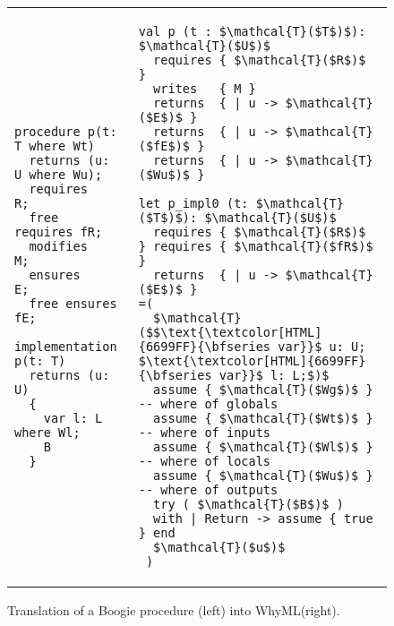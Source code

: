 \documentclass[a4paper,final]{llncs}
\newif\iflong
\newcommand{\tr}{\mathcal{T}}
\newcommand{\Boogie}{Boogie\xspace}
\newcommand{\WhyML}{WhyML\xspace}
\begin{document}
\begin{figure}[!htb]
\lstset{xleftmargin=5mm}
\scriptsize
\begin{tabular}{p{} p{}}
{\begin{lstlisting}[language=boogie]
procedure p(t: T where Wt) 
  returns (u: U where Wu);
  requires      R;
  free requires fR;
  modifies      M;
  ensures       E;
  free ensures  fE;

implementation p(t: T) 
  returns (u: U) 
  { 
    var l: L where Wl; 
    B 
  }\end{lstlisting}} 
&
\iflong
{\begin{lstlisting}[language=Why3]
val p (t : $\tr($T$)$): $\tr($U$)$
  requires { $\tr($R$)$ }
  writes   { M }
  returns  { | u -> $\tr($E$)$ }
  returns  { | u -> $\tr($fE$)$ }
  returns  { | u -> $\tr($Wu$)$ }

let p_impl0 (t: $\tr($T$)$): $\tr($U$)$
  requires { $\tr($R$)$ } requires { $\tr($fR$)$ }
  returns  { | u -> $\tr($E$)$ }
=(
  $\tr($$\text{\textcolor[HTML]{6699FF}{\bfseries var}}$ u: U; $\text{\textcolor[HTML]{6699FF}{\bfseries var}}$ l: L;$)$
  assume { $\tr($Wg$)$ }  -- where of globals
  assume { $\tr($Wt$)$ }  -- where of inputs
  assume { $\tr($Wl$)$ }  -- where of locals
  assume { $\tr($Wu$)$ }  -- where of outputs
  try ( $\tr($B$)$ )
  with | Return -> assume { true } end
  $\tr($u$)$
 )

let p_impl0_frame (t: $\tr($T$)$): $\tr($U$)$
  requires { $\tr($R$)$ } requires { $\tr($fR$)$ }
  writes { M }
  reads { $G$ } -- all globals
  returns  { | u -> true }
=( ... -- as in $\text{p\_impl0}$
   $\tr(m$ := $m)\textrm{, for }m\in$ M
   assume { yes($g$) }$\textrm{, for }g\in G$
   $\tr($u$)$ )\end{lstlisting}}
\else{\begin{lstlisting}[language=Why3]
val p (t : $\tr($T$)$): $\tr($U$)$
  requires { $\tr($R$)$ }
  writes   { M }
  returns  { | u -> $\tr($E$)$ }
  returns  { | u -> $\tr($fE$)$ }
  returns  { | u -> $\tr($Wu$)$ }

let p_impl0 (t: $\tr($T$)$): $\tr($U$)$
  requires { $\tr($R$)$ } requires { $\tr($fR$)$ }
  returns  { | u -> $\tr($E$)$ }
=(
  $\tr($$\text{\textcolor[HTML]{6699FF}{\bfseries var}}$ u: U; $\text{\textcolor[HTML]{6699FF}{\bfseries var}}$ l: L;$)$
  assume { $\tr($Wg$)$ }  -- where of globals
  assume { $\tr($Wt$)$ }  -- where of inputs
  assume { $\tr($Wl$)$ }  -- where of locals
  assume { $\tr($Wu$)$ }  -- where of outputs
  try ( $\tr($B$)$ )
  with | Return -> assume { true } end
  $\tr($u$)$
 )\end{lstlisting}}
\fi
\end{tabular}
\caption{Translation of a \Boogie procedure (left) into \WhyML (right).}
\label{fig:tr-procedures}
\end{figure}
\end{document}

